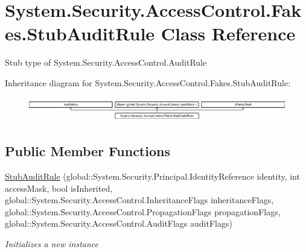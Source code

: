 \hypertarget{class_system_1_1_security_1_1_access_control_1_1_fakes_1_1_stub_audit_rule}{\section{System.\-Security.\-Access\-Control.\-Fakes.\-Stub\-Audit\-Rule Class Reference}
\label{class_system_1_1_security_1_1_access_control_1_1_fakes_1_1_stub_audit_rule}
}


Stub type of System.\-Security.\-Access\-Control.\-Audit\-Rule 


Inheritance diagram for System.\-Security.\-Access\-Control.\-Fakes.\-Stub\-Audit\-Rule\-:\begin{figure}[H]
\begin{center}
\leavevmode
\includegraphics[height=1.078998cm]{class_system_1_1_security_1_1_access_control_1_1_fakes_1_1_stub_audit_rule}
\end{center}
\end{figure}
\subsection*{Public Member Functions}
\begin{DoxyCompactItemize}
\item 
\hyperlink{class_system_1_1_security_1_1_access_control_1_1_fakes_1_1_stub_audit_rule_acd3e5492700d2926b126d3eacb01e9f5}{Stub\-Audit\-Rule} (global\-::\-System.\-Security.\-Principal.\-Identity\-Reference identity, int access\-Mask, bool is\-Inherited, global\-::\-System.\-Security.\-Access\-Control.\-Inheritance\-Flags inheritance\-Flags, global\-::\-System.\-Security.\-Access\-Control.\-Propagation\-Flags propagation\-Flags, global\-::\-System.\-Security.\-Access\-Control.\-Audit\-Flags audit\-Flags)
\begin{DoxyCompactList}\small\item\em Initializes a new instance\end{DoxyCompactList}\end{DoxyCompactItemize}
